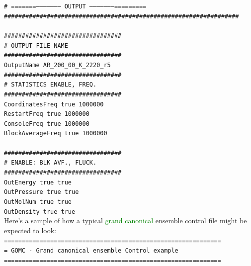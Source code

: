 \texttt{\#  =======-------------------- OUTPUT --------------------=========}\\
\texttt{\#\#\#\#\#\#\#\#\#\#\#\#\#\#\#\#\#\#\#\#\#\#\#\#\#\#\#\#\#\#\#\#\#\#\#\#\#\#\#\#\#\#\#\#\#\#\#\#\#\#\#\#\#\#\#\#\#\#\#\#\#\#\#\#\#\#}\\
\texttt{}\\
\texttt{\#\#\#\#\#\#\#\#\#\#\#\#\#\#\#\#\#\#\#\#\#\#\#\#\#\#\#\#\#\#\#\#\#}\\
\texttt{\# OUTPUT FILE NAME }\\
\texttt{\#\#\#\#\#\#\#\#\#\#\#\#\#\#\#\#\#\#\#\#\#\#\#\#\#\#\#\#\#\#\#\#\#}\\
\texttt{OutputName  AR\_200\_00\_K\_2220\_r5}\\
\newpage
\texttt{\#\#\#\#\#\#\#\#\#\#\#\#\#\#\#\#\#\#\#\#\#\#\#\#\#\#\#\#\#\#\#\#\#}\\
\texttt{\# STATISTICS	ENABLE,	FREQ.}\\
\texttt{\#\#\#\#\#\#\#\#\#\#\#\#\#\#\#\#\#\#\#\#\#\#\#\#\#\#\#\#\#\#\#\#\#}\\
\texttt{CoordinatesFreq      true   1000000}\\
\texttt{RestartFreq  	         true   1000000}\\
\texttt{ConsoleFreq            true   1000000}\\
\texttt{BlockAverageFreq   true   1000000}\\
\texttt{}\\
\texttt{\#\#\#\#\#\#\#\#\#\#\#\#\#\#\#\#\#\#\#\#\#\#\#\#\#\#\#\#\#\#\#\#\#}\\
\texttt{\# ENABLE: BLK AVF., FLUCK.}\\
\texttt{\#\#\#\#\#\#\#\#\#\#\#\#\#\#\#\#\#\#\#\#\#\#\#\#\#\#\#\#\#\#\#\#\#}\\
\texttt{OutEnergy         true    true}\\
\texttt{OutPressure      true    true}\\
\texttt{OutMolNum       true    true}\\
\texttt{OutDensity        true    true}\\
\newpage
Here’s a sample of how a typical \textcolor{green}{grand canonical} ensemble control file might be expected to look:\\
\texttt{=============================================================}\\
\texttt{= GOMC - Grand canonical ensemble Control example }\\
\texttt{=============================================================}\\
